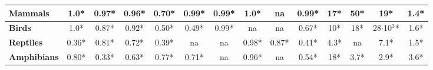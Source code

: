 \begin{table}[h!]
\begin{center}
\begin{tabular}{|l|c|c|c|c|c|c|c|c|c|c|c|c|c|}
\textbf{Mammals}                                      & 1.0*           & 0.97*        & 0.96*          & 0.70*         & 0.99*         & 0.99*         & 1.0*          & na            & 0.99*         & 17*                   & 50*                   & 19*                        & 1.4*                 \\ \hline
\textbf{Birds}                                        & 1.0*           & 0.87*        & 0.92*          & 0.50*         & 0.49*         & 0.99*         & na            & na            & 0.67*         & 10*                   & 18*                   & 28$\cdot$10$^3$*           & 1.6*                 \\ \hline
\textbf{Reptiles}                                     & 0.36*          & 0.81*        & 0.72*          & 0.39*         & na            & na            & 0.98*         & 0.87*         & 0.41*         & 4.3*                  & na                    & 7.1*                       & 1.5*                 \\ \hline
\textbf{Amphibians}                                   & 0.80*          & 0.33*        & 0.63*          & 0.77*         & 0.71*         & na            & 0.96*         & na            & 0.54*         & 18*                   & 3.7*                  & 2.9*                       & 3.6*                 \\ \hline
\end{tabular}
\end{center}
\end{table}


\pagebreak

